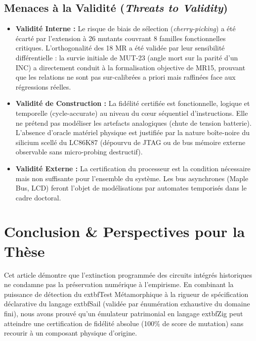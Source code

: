 \documentclass[10pt,journal,compsoc]{IEEEtran}
\begin{document}
\subsection{Menaces à la Validité (\textit{Threats to Validity})}
\begin{itemize}
    \item \textbf{Validité Interne :} Le risque de biais de sélection (\textit{cherry-picking}) a été écarté par l'extension à 26 mutants couvrant 8 familles fonctionnelles critiques. L'orthogonalité des 18 MR a été validée par leur sensibilité différentielle : la survie initiale de MUT-23 (angle mort sur la parité d'un INC) a directement conduit à la formalisation objective de MR15, prouvant que les relations ne sont pas sur-calibrées a priori mais raffinées face aux régressions réelles.
    \item \textbf{Validité de Construction :} La fidélité certifiée est fonctionnelle, logique et temporelle (cycle-accurate) au niveau du cœur séquentiel d'instructions. Elle ne prétend pas modéliser les artefacts analogiques (chute de tension batterie). L'absence d'oracle matériel physique est justifiée par la nature boîte-noire du silicium scellé du LC86K87 (dépourvu de JTAG ou de bus mémoire externe observable sans micro-probing destructif).
    \item \textbf{Validité Externe :} La certification du processeur est la condition nécessaire mais non suffisante pour l'ensemble du système. Les bus asynchrones (Maple Bus, LCD) feront l'objet de modélisations par automates temporisés dans le cadre doctoral.
\end{itemize}

\section{Conclusion \& Perspectives pour la Thèse}

Cet article démontre que l'extinction programmée des circuits intégrés historiques ne condamne pas la préservation numérique à l'empirisme. En combinant la puissance de détection du 	extbf{Test Métamorphique} à la rigueur de spécification déclarative du langage 	extbf{Sail} (validée par énumération exhaustive du domaine fini), nous avons prouvé qu'un émulateur patrimonial en langage 	extbf{Zig} peut atteindre une certification de fidélité absolue (100\% de score de mutation) sans recourir à un composant physique d'origine.
\end{document}
